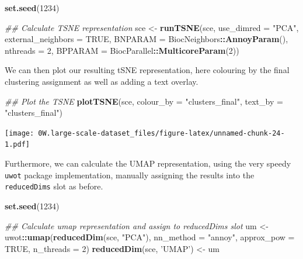 \documentclass[]{book}
\newenvironment{Shaded}{\begin{snugshade}}{\end{snugshade}}
\newcommand{\CommentTok}[1]{\textcolor[rgb]{0.56,0.35,0.01}{\textit{#1}}}
\newcommand{\DataTypeTok}[1]{\textcolor[rgb]{0.13,0.29,0.53}{#1}}
\newcommand{\DecValTok}[1]{\textcolor[rgb]{0.00,0.00,0.81}{#1}}
\newcommand{\KeywordTok}[1]{\textcolor[rgb]{0.13,0.29,0.53}{\textbf{#1}}}
\newcommand{\NormalTok}[1]{#1}
\newcommand{\OperatorTok}[1]{\textcolor[rgb]{0.81,0.36,0.00}{\textbf{#1}}}
\newcommand{\OtherTok}[1]{\textcolor[rgb]{0.56,0.35,0.01}{#1}}
\newcommand{\StringTok}[1]{\textcolor[rgb]{0.31,0.60,0.02}{#1}}
\begin{document}
\begin{Shaded}
\begin{Highlighting}[]
\KeywordTok{set.seed}\NormalTok{(}\DecValTok{1234}\NormalTok{)}

\CommentTok{## Calculate TSNE representation}
\NormalTok{sce <-}\StringTok{ }\KeywordTok{runTSNE}\NormalTok{(sce,}
               \DataTypeTok{use_dimred =} \StringTok{"PCA"}\NormalTok{,}
               \DataTypeTok{external_neighbors =} \OtherTok{TRUE}\NormalTok{, }
               \DataTypeTok{BNPARAM =}\NormalTok{ BiocNeighbors}\OperatorTok{::}\KeywordTok{AnnoyParam}\NormalTok{(),}
               \DataTypeTok{nthreads =} \DecValTok{2}\NormalTok{,}
               \DataTypeTok{BPPARAM =}\NormalTok{ BiocParallel}\OperatorTok{::}\KeywordTok{MulticoreParam}\NormalTok{(}\DecValTok{2}\NormalTok{))}
\end{Highlighting}
\end{Shaded}

We can then plot our resulting tSNE representation, here colouring by the final clustering assignment as well as adding a text overlay.

\begin{Shaded}
\begin{Highlighting}[]
\CommentTok{## Plot the TSNE}
\KeywordTok{plotTSNE}\NormalTok{(sce,}
         \DataTypeTok{colour_by =} \StringTok{"clusters_final"}\NormalTok{,}
         \DataTypeTok{text_by =} \StringTok{"clusters_final"}\NormalTok{)}
\end{Highlighting}
\end{Shaded}

\texttt{[image: 0W.large-scale-dataset\_files/figure-latex/unnamed-chunk-24-1.pdf]}

Furthermore, we can calculate the UMAP representation, using the very speedy \texttt{uwot} package implementation, manually assigning the results into the \texttt{reducedDims} slot as before.

\begin{Shaded}
\begin{Highlighting}[]
\KeywordTok{set.seed}\NormalTok{(}\DecValTok{1234}\NormalTok{)}

\CommentTok{## Calculate umap representation and assign to reducedDims slot}
\NormalTok{um <-}\StringTok{ }\NormalTok{uwot}\OperatorTok{::}\KeywordTok{umap}\NormalTok{(}\KeywordTok{reducedDim}\NormalTok{(sce, }\StringTok{"PCA"}\NormalTok{), }\DataTypeTok{nn_method =} \StringTok{"annoy"}\NormalTok{,}
                 \DataTypeTok{approx_pow =} \OtherTok{TRUE}\NormalTok{, }\DataTypeTok{n_threads =} \DecValTok{2}\NormalTok{)}
\KeywordTok{reducedDim}\NormalTok{(sce, }\StringTok{'UMAP'}\NormalTok{) <-}\StringTok{ }\NormalTok{um}
\end{Highlighting}
\end{Shaded}
\end{document}
